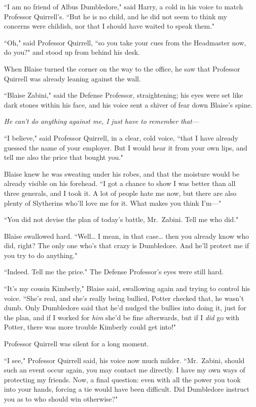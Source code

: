 ``I am no friend of Albus Dumbledore," said Harry, a cold in his voice to match Professor Quirrell's. ``But he is no child, and he did not seem to think my concerns were childish, nor that I should have waited to speak them."

``Oh," said Professor Quirrell, ``so you take your cues from the Headmaster now, do you?" and stood up from behind his desk.

\later

When Blaise turned the corner on the way to the office, he saw that Professor Quirrell was already leaning against the wall.

``Blaise Zabini," said the Defense Professor, straightening; his eyes were set like dark stones within his face, and his voice sent a shiver of fear down Blaise's spine.

\emph{He can't do anything against me, I just have to remember that—}

``I believe," said Professor Quirrell, in a clear, cold voice, ``that I have already guessed the name of your employer. But I would hear it from your own lips, and tell me also the price that bought you."

Blaise knew he was sweating under his robes, and that the moisture would be already visible on his forehead. ``I got a chance to show I was better than all three generals, and I took it. A lot of people hate me now, but there are also plenty of Slytherins who'll love me for it. What makes you think I'm—"

``You did not devise the plan of today's battle, Mr.~Zabini. Tell me who did."

Blaise swallowed hard. ``Well{\ldots} I mean, in that case{\ldots} then you already know who did, right? The only one who's that crazy is Dumbledore. And he'll protect me if you try to do anything."

``Indeed. Tell me the price." The Defense Professor's eyes were still hard.

``It's my cousin Kimberly," Blaise said, swallowing again and trying to control his voice. ``She's real, and she's really being bullied, Potter checked that, he wasn't dumb. Only Dumbledore said that he'd nudged the bullies into doing it, just for the plan, and if I worked for \emph{him} she'd be fine afterwards, but if I \emph{did} go with Potter, there was more trouble Kimberly could get into!"

Professor Quirrell was silent for a long moment.

``I see," Professor Quirrell said, his voice now much milder. ``Mr.~Zabini, should such an event occur again, you may contact me directly. I have my own ways of protecting my friends. Now, a final question: even with all the power you took into your hands, forcing a tie would have been difficult. Did Dumbledore instruct you as to who should win otherwise?"

